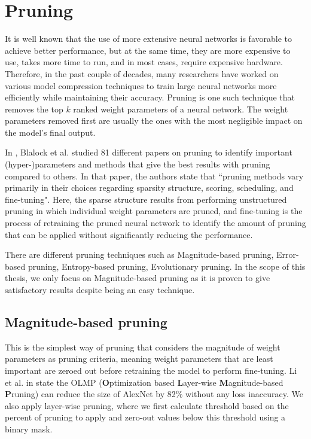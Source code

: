 
\newpage
\section{Pruning}\label{section:pruning}

It is well known that the use of more extensive neural networks is favorable to achieve better performance, but at the same time, they are more expensive to use, takes more time to run, and in most cases, require expensive hardware. Therefore, in the past couple of decades, many researchers have worked on various model compression techniques to train large neural networks more efficiently while maintaining their accuracy. Pruning is one such technique that removes the top $k$ ranked weight parameters of a neural network. The weight parameters removed first are usually the ones with the most negligible impact on the model's final output.

In \cite{blalock}, Blalock et al. studied 81 different papers on pruning to identify important (hyper-)parameters and methods that give the best results with pruning compared to others. In that paper, the authors state that ``pruning methods vary primarily in their choices regarding sparsity structure, scoring, scheduling, and fine-tuning". Here, the sparse structure results from performing unstructured pruning in which individual weight parameters are pruned, and fine-tuning is the process of retraining the pruned neural network to identify the amount of pruning that can be applied without significantly reducing the performance.

There are different pruning techniques such as Magnitude-based pruning, Error-based pruning, Entropy-based pruning, Evolutionary pruning. In the scope of this thesis, we only focus on Magnitude-based pruning as it is proven to give satisfactory results despite being an easy technique.

\subsection{Magnitude-based pruning}

This is the simplest way of pruning that considers the magnitude of weight parameters as pruning criteria, meaning weight parameters that are least important are zeroed out before retraining the model to perform fine-tuning. Li et al. in \cite{li} state the OLMP (\textbf{O}ptimization based \textbf{L}ayer-wise \textbf{M}agnitude-based \textbf{P}runing) can reduce the size of AlexNet by 82\% without any loss inaccuracy. We also apply layer-wise pruning, where we first calculate threshold based on the percent of pruning to apply and zero-out values below this threshold using a binary mask.

